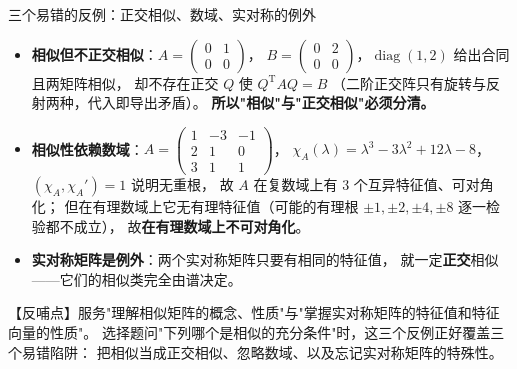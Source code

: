 \begin{fdeep}{三个易错的反例：正交相似、数域、实对称的例外}
\begin{itemize}[leftmargin=1.8em,itemsep=0.25em]
\item \textbf{相似但不正交相似}：$A=\begin{pmatrix}0&1\\0&0\end{pmatrix}$，
      $B=\begin{pmatrix}0&2\\0&0\end{pmatrix}$，$\operatorname{diag}(1,2)$ 给出合同且两矩阵相似，
      却不存在正交 $Q$ 使 $Q^{\mathrm T}AQ=B$
      （二阶正交阵只有旋转与反射两种，代入即导出矛盾）。
      \textbf{所以"相似"与"正交相似"必须分清。}
\item \textbf{相似性依赖数域}：$A=\begin{pmatrix}1&-3&-1\\2&1&0\\3&1&1\end{pmatrix}$，
      $\chi_A(\lambda)=\lambda^{3}-3\lambda^{2}+12\lambda-8$，$(\chi_A,\chi_A')=1$ 说明无重根，
      故 $A$ 在复数域上有 $3$ 个互异特征值、可对角化；
      但在有理数域上它无有理特征值（可能的有理根 $\pm1,\pm2,\pm4,\pm8$ 逐一检验都不成立），
      故\textbf{在有理数域上不可对角化}。
\item \textbf{实对称矩阵是例外}：两个实对称矩阵只要有相同的特征值，
      就一定\textbf{正交}相似——它们的相似类完全由谱决定。
\end{itemize}
【反哺点】服务"理解相似矩阵的概念、性质"与"掌握实对称矩阵的特征值和特征向量的性质"。
选择题问"下列哪个是相似的充分条件"时，这三个反例正好覆盖三个易错陷阱：
把相似当成正交相似、忽略数域、以及忘记实对称矩阵的特殊性。
\end{fdeep}

